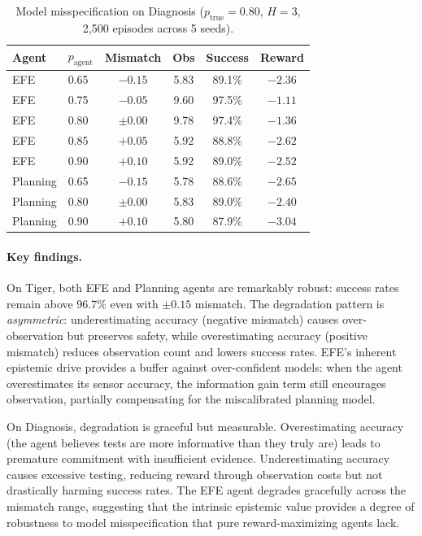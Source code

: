 \documentclass{article}
\begin{document}
\begin{table}[h]
\centering
\caption{Model misspecification on Diagnosis ($p_{\text{true}}{=}0.80$, $H{=}3$, 2{,}500 episodes across 5 seeds).}
\label{tab:misspec-diag}
\begin{small}
\begin{tabular}{llcccc}
\toprule
Agent & $p_{\text{agent}}$ & Mismatch & Obs & Success & Reward \\
\midrule
EFE & 0.65 & $-0.15$ & 5.83 & 89.1\% & $-2.36$ \\
EFE & 0.75 & $-0.05$ & 9.60 & 97.5\% & $-1.11$ \\
EFE & 0.80 & $\pm 0.00$ & 9.78 & 97.4\% & $-1.36$ \\
EFE & 0.85 & $+0.05$ & 5.92 & 88.8\% & $-2.62$ \\
EFE & 0.90 & $+0.10$ & 5.92 & 89.0\% & $-2.52$ \\
\midrule
Planning & 0.65 & $-0.15$ & 5.78 & 88.6\% & $-2.65$ \\
Planning & 0.80 & $\pm 0.00$ & 5.83 & 89.0\% & $-2.40$ \\
Planning & 0.90 & $+0.10$ & 5.80 & 87.9\% & $-3.04$ \\
\bottomrule
\end{tabular}
\end{small}
\end{table}

\paragraph{Key findings.} On Tiger, both EFE and Planning agents are remarkably robust: success rates remain above 96.7\% even with $\pm 0.15$ mismatch. The degradation pattern is \emph{asymmetric}: underestimating accuracy (negative mismatch) causes over-observation but preserves safety, while overestimating accuracy (positive mismatch) reduces observation count and lowers success rates. EFE's inherent epistemic drive provides a buffer against over-confident models: when the agent overestimates its sensor accuracy, the information gain term still encourages observation, partially compensating for the miscalibrated planning model.

On Diagnosis, degradation is graceful but measurable. Overestimating accuracy (the agent believes tests are more informative than they truly are) leads to premature commitment with insufficient evidence. Underestimating accuracy causes excessive testing, reducing reward through observation costs but not drastically harming success rates. The EFE agent degrades gracefully across the mismatch range, suggesting that the intrinsic epistemic value provides a degree of robustness to model misspecification that pure reward-maximizing agents lack.
\end{document}
